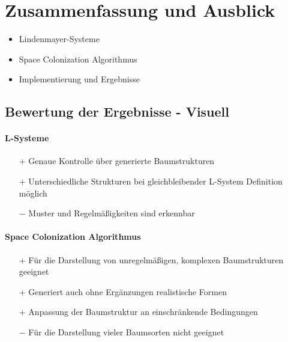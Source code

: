 \newpage
\slidetitle{}
\section{Zusammenfassung und Ausblick \\}


\begin{itemize}
	\item Lindenmayer-Systeme\\
	
	\item Space Colonization Algorithmus\\
	
	\item Implementierung und Ergebnisse
\end{itemize}


\newpage
{}
\subsection{Bewertung der Ergebnisse - Visuell\\}

\paragraph{L-Systeme\\}

\begin{itemize}
	\item[$+$] Genaue Kontrolle über generierte Baumstrukturen\\
	
	\item[$+$] Unterschiedliche Strukturen bei gleichbleibender L-System Definition möglich\\
	
	\item[$-$] Muster und Regelmäßigkeiten sind erkennbar
\end{itemize}




\newpage
\paragraph{Space Colonization Algorithmus\\}

\begin{itemize}
	\item[$+$] Für die Darstellung von unregelmäßigen, komplexen Baumstrukturen geeignet\\
	
	\item[$+$] Generiert auch ohne Ergänzungen realistische Formen\\
	
	\item[$+$] Anpassung der Baumstruktur an einschränkende Bedingungen\\
	
	\item[$-$] Für die Darstellung vieler Baumsorten nicht geeignet\\
\end{itemize}




